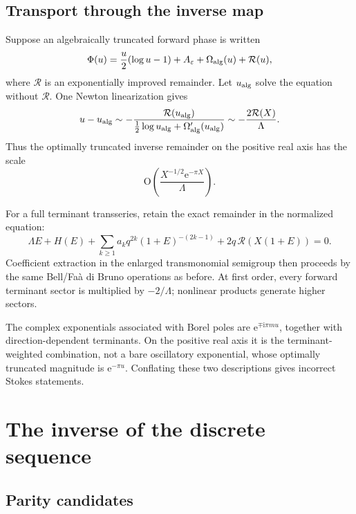 \documentclass[11pt,a4paper,oneside]{book}
\newcommand{\e}{\mathrm e}
\newcommand{\ii}{\mathrm i}
\newcommand{\Ord}{\mathrm O}
\newcommand{\eps}{\varepsilon}
\begin{document}
\section{Transport through the inverse map}

Suppose an algebraically truncated forward phase is written
\[
 \Phi(u)=\frac{u}{2}(\log u-1)+A_\eps+\Omega_{\rm alg}(u)
          +\mathcal R(u),
\]
where \(\mathcal R\) is an exponentially improved remainder.  Let
\(u_{\rm alg}\) solve the equation without \(\mathcal R\).  One Newton
linearization gives
\begin{equation}\label{eq:exp-transport}
 u-u_{\rm alg}
 \sim
 -\frac{\mathcal R(u_{\rm alg})}
  {\frac12\log u_{\rm alg}+\Omega_{\rm alg}'(u_{\rm alg})}
 \sim
 -\frac{2\mathcal R(X)}{\Lambda}.
\end{equation}
Thus the optimally truncated inverse remainder on the positive real axis has
the scale
\begin{equation}\label{eq:inverse-exp-scale}
 \Ord\!\left(
 \frac{X^{-1/2}\e^{-\pi X}}{\Lambda}
 \right).
\end{equation}

For a full terminant transseries, retain the exact remainder in the normalized
equation:
\begin{equation}\label{eq:master-with-rem}
 \Lambda E+H(E)
 +\sum_{k\ge1}a_kq^{2k}(1+E)^{-(2k-1)}
 +2q\,\mathcal R(X(1+E))=0.
\end{equation}
Coefficient extraction in the enlarged transmonomial semigroup then proceeds
by the same Bell/Fa\`a di Bruno operations as before.  At first order, every
forward terminant sector is multiplied by \(-2/\Lambda\); nonlinear products
generate higher sectors.

\begin{warningbox}
The complex exponentials associated with Borel poles are
\(\e^{\mp\ii\pi m u}\), together with direction-dependent terminants.
On the positive real axis it is the terminant-weighted combination, not a bare
oscillatory exponential, whose optimally truncated magnitude is
\(\e^{-\pi u}\).  Conflating these two descriptions gives incorrect Stokes
statements.
\end{warningbox}

\chapter{The inverse of the discrete sequence}\label{ch:discrete}

\section{Parity candidates}
\end{document}
